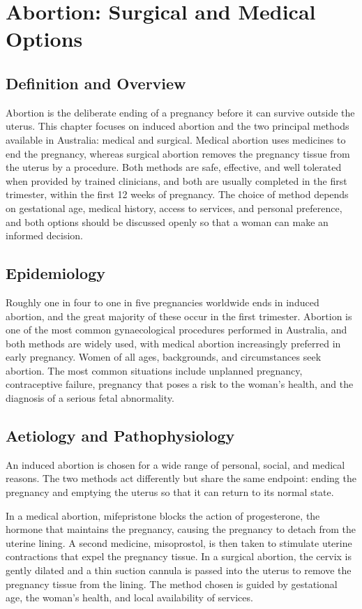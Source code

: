 \chapter{Abortion: Surgical and Medical Options}

\section*{Definition and Overview}
Abortion is the deliberate ending of a pregnancy before it can survive outside the uterus. This chapter focuses on induced abortion and the two principal methods available in Australia: medical and surgical. Medical abortion uses medicines to end the pregnancy, whereas surgical abortion removes the pregnancy tissue from the uterus by a procedure. Both methods are safe, effective, and well tolerated when provided by trained clinicians, and both are usually completed in the first trimester, within the first 12 weeks of pregnancy. The choice of method depends on gestational age, medical history, access to services, and personal preference, and both options should be discussed openly so that a woman can make an informed decision.

\section*{Epidemiology}
Roughly one in four to one in five pregnancies worldwide ends in induced abortion, and the great majority of these occur in the first trimester. Abortion is one of the most common gynaecological procedures performed in Australia, and both methods are widely used, with medical abortion increasingly preferred in early pregnancy. Women of all ages, backgrounds, and circumstances seek abortion. The most common situations include unplanned pregnancy, contraceptive failure, pregnancy that poses a risk to the woman's health, and the diagnosis of a serious fetal abnormality.

\section*{Aetiology and Pathophysiology}
An induced abortion is chosen for a wide range of personal, social, and medical reasons. The two methods act differently but share the same endpoint: ending the pregnancy and emptying the uterus so that it can return to its normal state.

In a medical abortion, mifepristone blocks the action of progesterone, the hormone that maintains the pregnancy, causing the pregnancy to detach from the uterine lining. A second medicine, misoprostol, is then taken to stimulate uterine contractions that expel the pregnancy tissue. In a surgical abortion, the cervix is gently dilated and a thin suction cannula is passed into the uterus to remove the pregnancy tissue from the lining. The method chosen is guided by gestational age, the woman's health, and local availability of services.

